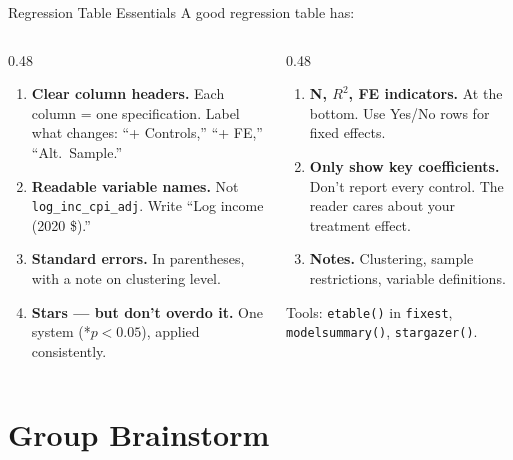 \begin{frame}{Regression Table Essentials}
  \footnotesize
  A good regression table has:

  \vspace{2pt}

  \begin{columns}[T]
    \begin{column}{0.48\textwidth}
      \begin{enumerate}\setlength\itemsep{1pt}
        \item \textbf{Clear column headers.} Each column = one specification. Label what changes: ``+ Controls,'' ``+ FE,'' ``Alt.\ Sample.''
        \item \textbf{Readable variable names.} Not \texttt{log\_inc\_cpi\_adj}. Write ``Log income (2020 \$).''
        \item \textbf{Standard errors.} In parentheses, with a note on clustering level.
        \item \textbf{Stars --- but don't overdo it.} One system (*$p<0.05$), applied consistently.
      \end{enumerate}
    \end{column}
    \begin{column}{0.48\textwidth}
      \begin{enumerate}\setlength\itemsep{1pt}
        \setcounter{enumi}{4}
        \item \textbf{N, $R^2$, FE indicators.} At the bottom. Use Yes/No rows for fixed effects.
        \item \textbf{Only show key coefficients.} Don't report every control. The reader cares about your treatment effect.
        \item \textbf{Notes.} Clustering, sample restrictions, variable definitions.
      \end{enumerate}

      \vspace{2pt}

      {\scriptsize Tools: \texttt{etable()} in \texttt{fixest}, \texttt{modelsummary()}, \texttt{stargazer()}.}
    \end{column}
  \end{columns}
\end{frame}

\section{Group Brainstorm}

